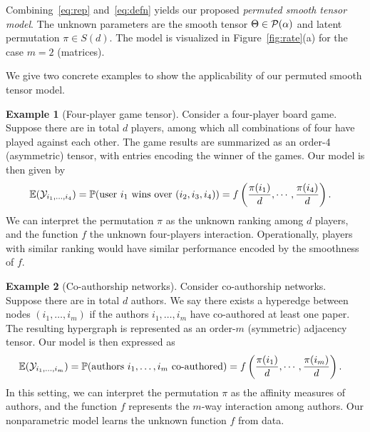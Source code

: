\documentclass{article}
\theoremstyle{definition}
\newtheorem{example}{Example}
\begin{document}
Combining~\eqref{eq:rep} and~\eqref{eq:defn} yields our proposed \emph{permuted smooth tensor model}. 
The unknown parameters are the smooth tensor $\Theta \in \mathcal{P}(\alpha)$ and latent permutation $\pi \in S(d)$. The model is visualized in Figure~\ref{fig:rate}(a) for the case $m=2$ (matrices). 

We give two concrete examples to show the applicability of our permuted smooth tensor model. 

\begin{example}[Four-player game tensor] Consider a four-player board game. Suppose there are in total $d$ players, among which all combinations of four have played against each other. The game results are summarized as an order-4 (asymmetric) tensor, with entries encoding the winner of the games. Our model is then given by
\begin{align}
\mathbb{E}(\mathcal{Y}_{i_1,\ldots,i_4})&=\mathbb{P}(\text{user $i_1$ wins over $(i_2,i_3,i_4)$})
=f\left({\pi(i_1)\over d},\cdots, {\pi(i_4)\over d}\right).
\end{align}
We can interpret the permutation $\pi$ as the unknown ranking among $d$ players, and the function $f$ the unknown four-players interaction. Operationally, players with similar ranking would have similar performance encoded by the smoothness of $f$. 
\end{example}

\begin{example}[Co-authorship networks] Consider co-authorship networks. Suppose there are in total $d$ authors. We say there exists a hyperedge between nodes $(i_1,\ldots,i_m)$ if the authors $i_1,\ldots,i_m$ have co-authored at least one paper. The resulting hypergraph is represented as an order-$m$ (symmetric) adjacency tensor. Our model is then expressed as
\begin{align}
    \mathbb{E}(\mathcal{Y}_{i_1,\ldots,i_m})&=\mathbb{P}(\text{authors $i_1,\ldots,i_m$ co-authored})
=f\left({\pi(i_1)\over d},\cdots, {\pi(i_m)\over d}\right).
\end{align}
In this setting, we can interpret the permutation $\pi$ as the affinity measures of authors, and the function $f$ represents the $m$-way interaction among authors. Our nonparametric model learns the unknown function $f$ from data. 

\end{example}



\end{document}
